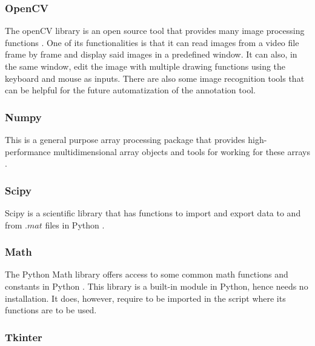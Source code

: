 \subsubsection*{OpenCV}

The openCV library is an open source tool that provides many image processing functions \cite{OpenCV}. One of its functionalities is that it can read images from a video file frame by frame and display said images in a predefined window. It can also, in the same window, edit the image with multiple drawing functions using the keyboard and mouse as inputs. There are also some image recognition tools that can be helpful for the future automatization of the annotation tool.



\subsubsection*{Numpy}

This is a general purpose array processing package that provides high-performance multidimensional array objects and tools for working for these arrays \cite{numpy_module}.


\subsubsection*{Scipy}

Scipy is a scientific library that has functions to import and export data to and from $.mat$ files in Python \cite{scipy_module}.

\subsubsection*{Math}

The Python Math library offers access to some common math functions and constants in Python \cite{math_module}. This library is a built-in module in Python, hence needs no installation. It does, however, require to be imported in the script where its functions are to be used.  

\subsubsection*{Tkinter}

